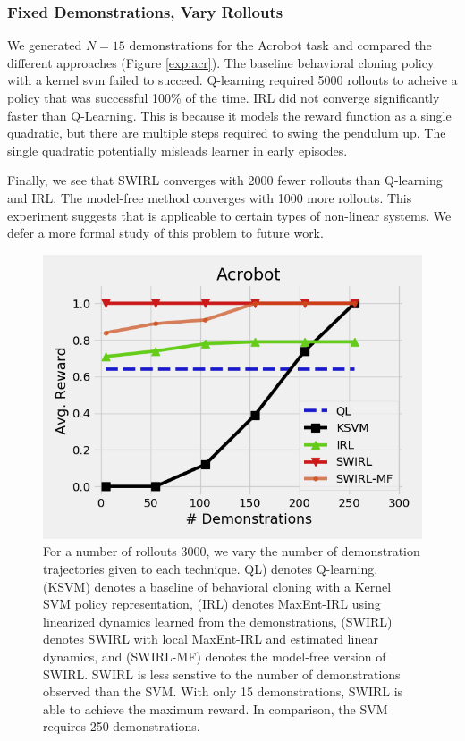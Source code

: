 \subsubsection{Fixed Demonstrations, Vary Rollouts}
We generated $N=15$ demonstrations for the Acrobot task and compared the different approaches (Figure \ref{exp:acr}). 
The baseline behavioral cloning policy with a kernel svm failed to succeed.
Q-learning required 5000 rollouts to acheive a policy that was successful 100\% of the time.
IRL did not converge significantly faster than Q-Learning.
This is because it models the reward function as a single quadratic, but there are multiple steps required to swing the pendulum up.
The single quadratic potentially misleads learner in early episodes.

Finally, we see that SWIRL converges with 2000 fewer rollouts than Q-learning and IRL.
The model-free method converges with 1000 more rollouts.
This experiment suggests that \hirl is applicable to certain types of non-linear systems.
We defer a more formal study of this problem to future work. 


\begin{figure}[t]
\centering
 \includegraphics[width=0.8\columnwidth]{new-exp/acr2.png}
 \caption{For a number of rollouts $3000$, we vary the number of demonstration trajectories given to each technique. QL) denotes Q-learning, (KSVM) denotes a baseline of behavioral cloning with a Kernel SVM policy representation, (IRL) denotes MaxEnt-IRL using linearized dynamics learned from the demonstrations, (SWIRL) denotes SWIRL with local MaxEnt-IRL and estimated linear dynamics, and (SWIRL-MF) denotes the model-free version of SWIRL. SWIRL is less senstive to the number of demonstrations observed than the SVM. With only 15 demonstrations, SWIRL is able to achieve the maximum reward. In comparison, the SVM requires 250 demonstrations. \label{exp:acr2}}
\end{figure}


